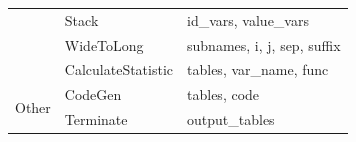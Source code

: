 \begin{table}[t]
{\begin{tabular}{|c|l|l|}
                                          & Stack                  & id\_vars, value\_vars \\
                                          & WideToLong             & subnames, i, j, sep, suffix                   \\
                                          & CalculateStatistic     & tables, var\_name, func                 \\ \hline \hline 
    \multirow{2}{*}{Other}                & CodeGen         & tables, code                            \\
                                          & Terminate              & output\_tables \\ \hline                              
  \end{tabular}
  }
  \label{tbl:operator_space}
  \vspace{-0.5em}
\end{table}